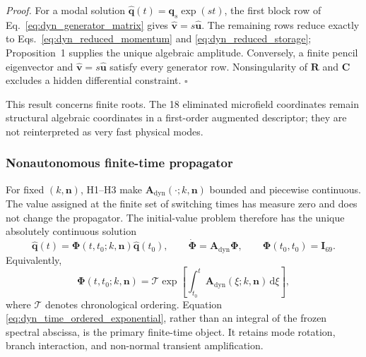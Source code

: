 \emph{Proof.}
For a modal solution $\widehat{\boldsymbol q}(t)=
\boldsymbol q_s\exp(st)$, the first block row of
Eq.~\eqref{eq:dyn_generator_matrix} gives
$\widehat{\boldsymbol v}=s\widehat{\boldsymbol u}$.  The remaining rows reduce
exactly to Eqs.~\eqref{eq:dyn_reduced_momentum} and
\eqref{eq:dyn_reduced_storage}; Proposition~1 supplies the unique algebraic
amplitude.  Conversely, a finite pencil eigenvector and
$\widehat{\boldsymbol v}=s\widehat{\boldsymbol u}$ satisfy every generator
row.  Nonsingularity of $\boldsymbol R$ and $\boldsymbol C$ excludes a hidden
differential constraint. \hfill$\square$

This result concerns finite roots.  The 18 eliminated microfield coordinates
remain structural algebraic coordinates in a first-order augmented descriptor;
they are not reinterpreted as very fast physical modes.

\subsubsection{Nonautonomous finite-time propagator}

For fixed $(k,\boldsymbol n)$, H1--H3 make
$\boldsymbol A_{\mathrm{dyn}}(\cdot;k,\boldsymbol n)$ bounded and piecewise
continuous.  The value assigned at the finite set of switching times has
measure zero and does not change the propagator.  The initial-value problem
therefore has the unique absolutely continuous solution
\begin{equation}
 \widehat{\boldsymbol q}(t)
 =\boldsymbol\Phi(t,t_0;k,\boldsymbol n)
  \widehat{\boldsymbol q}(t_0),
 \qquad
 \dot{\boldsymbol\Phi}
 =\boldsymbol A_{\mathrm{dyn}}\boldsymbol\Phi,
 \qquad
 \boldsymbol\Phi(t_0,t_0)=\boldsymbol I_{69}.
 \label{eq:dyn_propagator_ivp}
\end{equation}
Equivalently,
\begin{equation}
 \boldsymbol\Phi(t,t_0;k,\boldsymbol n)
 =\mathcal T\exp\!\left[
   \int_{t_0}^{t}\boldsymbol A_{\mathrm{dyn}}
   (\xi;k,\boldsymbol n)\,\mathrm d\xi
  \right],
 \label{eq:dyn_time_ordered_exponential}
\end{equation}
where $\mathcal T$ denotes chronological ordering.  Equation
\eqref{eq:dyn_time_ordered_exponential}, rather than an integral of the frozen
spectral abscissa, is the primary finite-time object.  It retains mode rotation,
branch interaction, and non-normal transient amplification.

